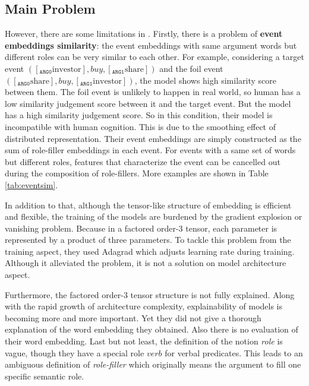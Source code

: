 \documentclass[a4paper]{article}
\begin{document}
\subsection{Main Problem} 
However, there are some limitations in \citet{tilk2016event}. Firstly, there is a problem of \textbf{event embeddings similarity}: the event embeddings with same argument words but different roles can be very similar to each other. For example, considering a target event $([_{\texttt{ARG0}} \text{investor}], buy, [_{\texttt{ARG1}}\text{share}])$ and the foil event $([_{\texttt{ARG0}}\text{share}], buy, [_{\texttt{ARG1}}\text{investor}])$, the model shows high similarity score between them. The foil event is unlikely to happen in real world, so human has a low similarity judgement score between it and the target event. But the model has a high similarity judgement score. So in this condition, their model is incompatible with human cognition. This is due to the smoothing effect of distributed representation. Their event embeddings are simply constructed as the sum of role-filler embeddings in each event. For events with a same set of words but different roles, features that characterize the event can be cancelled out during the composition of role-fillers. More examples are shown in Table \ref{tab:eventsim}. 
% 
% 
% 
%
% 
%

In addition to that, although the tensor-like structure of embedding is efficient and flexible, the training of the models are burdened by the gradient explosion or vanishing problem. Because in a factored order-3 tensor, each parameter is represented by a product of three parameters. To tackle this problem from the training aspect, they used Adagrad \citep{duchi2011adaptive} which adjusts learning rate during training. Although it alleviated the problem, it is not a solution on model architecture aspect. 

Furthermore, the factored order-3 tensor structure is not fully explained. Along with the rapid growth of architecture complexity, explainability of models is becoming more and more important. Yet they did not give a thorough explanation of the word embedding they obtained. Also there is no evaluation of their word embedding. Last but not least, the definition of the notion \textit{role} is vague, though they have a special role $verb$ for verbal predicates. This leads to an ambiguous definition of \textit{role-filler} which originally means the argument to fill one specific semantic role. 
% 
% 
% 
% 
% 
%
\end{document}
